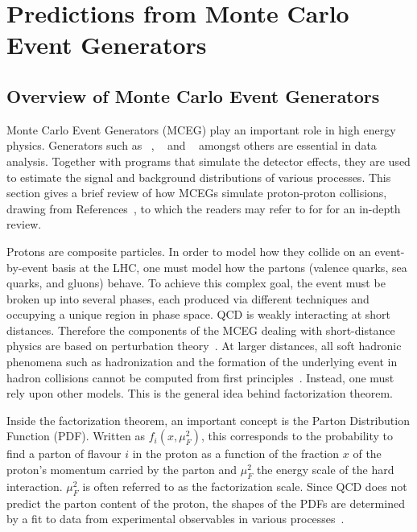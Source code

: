 \section{Predictions from Monte Carlo Event Generators}
\subsection{Overview of Monte Carlo Event Generators}
\label{sec:mceg}
Monte Carlo Event Generators (MCEG) play an important role in high energy physics. Generators such as \herwig{}~\cite{Bellm:2017bvx}, \pythia{}~\cite{Sjostrand:2006za} and \SHERPA~\cite{Gleisberg:2008ta} amongst others are essential in data analysis. Together with programs that simulate the detector effects, they are used to estimate the signal and background distributions of various processes. This section gives a brief review of how MCEGs simulate proton-proton collisions, drawing from References~\cite{seymour2013monte,hoche2015introduction,pdg_2021}, to which the readers may refer to for for an in-depth review. 

Protons are composite particles. In order to model how they collide on an event-by-event basis at the LHC, one must model how the partons (valence quarks, sea quarks, and gluons) behave. To achieve this complex goal, the event must be broken up into several phases, each produced via different techniques and occupying a unique region in phase space. QCD is weakly interacting at short distances. Therefore the components of the MCEG dealing with short-distance physics are based on perturbation theory~\cite{pdg}. At larger distances, all soft hadronic phenomena such as hadronization and the formation of the underlying event in hadron collisions cannot be computed from first principles~\cite{pdg}. Instead, one must rely upon other models. This is the general idea behind factorization theorem.

Inside the factorization theorem, an important concept is the Parton Distribution Function (PDF). Written as $f_i(x,\mu_F^2)$, this corresponds to the probability to find a parton of flavour $i$ in the proton as a function of the fraction $x$ of the proton’s momentum carried by the parton and $\mu_F^2$ the energy scale of the hard interaction. $\mu_F^2$ is often referred to as the factorization scale. Since QCD does not predict the parton content of the proton, the shapes of the PDFs are determined by a fit to data from experimental observables in various processes~\cite{placakyte2011parton}.

